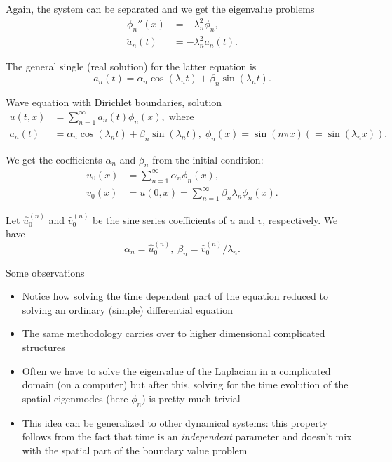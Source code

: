 \begin{frame}
	Again, the system can be separated and we get the eigenvalue problems
	\begin{align*}
		\phi_n''(x) &= -\lambda_n^2 \phi_n,  \\
		\ddot{a}_{n}(t) &= -\lambda_n^2 a_n(t).
	\end{align*}

	\pause
	The general single (real solution) for the latter equation is 
	\[ a_n(t) = \alpha_n \cos(\lambda_n t) + \beta_n \sin(\lambda_n t). \]
\end{frame}

\begin{frame}
	\begin{block}{\centering Wave equation with Dirichlet boundaries, solution}
		\begin{align*}
			u(t,x) &= \sum_{n=1}^{\infty} a_n(t) \phi_n(x), \; \text{where} \\
			a_n(t) &= \alpha_n \cos(\lambda_n t) + \beta_n \sin(\lambda_n t), \; \phi_n(x) = \sin(n \pi x)(=\sin(\lambda_n x)).
		\end{align*}
	\end{block}

	\pause
	We get the coefficients $ \alpha_n $ and $ \beta_n $ from the initial condition:
	\begin{align*}
		u_0 (x) &= \sum_{n=1}^{\infty} \alpha_n \phi_n(x), \\
		v_0 (x) &= \dot{u}(0,x) = \sum_{n=1}^{\infty} \beta_n \lambda_n \phi_n(x).
	\end{align*}

	Let $ \hat{u}_0^{(n)} $ and $ \hat{v}_0^{(n)} $ be the sine series coefficients of $ u $ and $ v $, respectively. We have 
	\[ \alpha_n = \hat{u}_0^{(n)} ,\; \beta_n = \hat{v}_0^{(n)}/\lambda_n. \]
\end{frame}

\begin{frame}{Some observations}
	\begin{itemize}[<+->]
		\item Notice how solving the time dependent part of the equation reduced to solving an ordinary (simple) differential equation
		\item The same methodology carries over to higher dimensional complicated structures
		\item Often we have to solve the eigenvalue of the Laplacian in a complicated domain (on a computer) but after this, solving for the time evolution of the spatial eigenmodes (here $ \phi_n $) is pretty much trivial
		\item This idea can be generalized to other dynamical systems: this property follows from the fact that time is an \emph{independent} parameter and doesn't mix with the spatial part of the boundary value problem	
	\end{itemize}
\end{frame}

